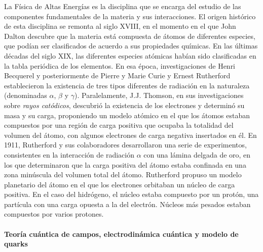 La Física de Altas Energías es la disciplina que se encarga del estudio de las componentes fundamentales de la materia y sus interacciones. El origen histórico de esta disciplina se remonta al siglo XVIII, en el momento en el que John Dalton descubre que la materia está compuesta de átomos de diferentes especies, que podían ser clasificados de acuerdo a sus propiedades químicas. En las últimas décadas del siglo XIX, las diferentes especies atómicas habían sido clasificadas en la tabla periódica de los elementos. En esa época, investigaciones de Henri Becquerel y posteriormente de Pierre y Marie Curie y Ernest Rutherford establecieron la existencia de tres tipos diferentes de radiación en la naturaleza (denominadas $\alpha$, $\beta$ y $\gamma$). Paralelamente, J.J. Thomson, en sus investigaciones sobre \emph{rayos catódicos}, descubrió la existencia de los electrones y determinó su masa y su carga, proponiendo un modelo atómico en el que los átomos estaban compuestos por una región de carga positiva que ocupaba la totalidad del volumen del átomo, con algunos electrones de carga negativa insertados en él. En 1911, Rutherford y sus colaboradores desarrollaron una serie de experimentos, consistentes en la interacción de radiación $\alpha$ con una lámina delgada de oro, en los que determinaron que la carga positiva del átomo estaba confinada en una zona minúscula del volumen total del átomo. Rutherford propuso un modelo planetario del átomo en el que los electrones orbitaban un núcleo de carga positiva. En el caso del hidrógeno, el núcleo estaba compuesto por un protón, una partícula con una carga opuesta a la del electrón. Núcleos más pesados estaban compuestos por varios protones.


\paragraph{Teoría cuántica de campos, electrodinámica cuántica y modelo de quarks\\\\}

